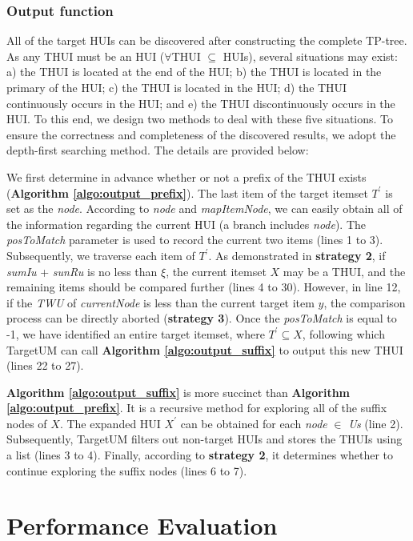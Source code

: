 \documentclass[journal]{IEEEtran}
\begin{document}
\subsubsection{Output function}

All of the target HUIs can be discovered after constructing the complete TP-tree. As any THUI must be an HUI ($\forall$THUI $\subseteq$ HUIs), several situations may exist: a) the THUI is located at the end of the HUI; b) the THUI is located in the primary of the HUI; c) the THUI is located in the HUI; d) the THUI continuously occurs in the HUI; and e) the THUI discontinuously occurs in the HUI. To this end, we design two methods to deal with these five situations. To ensure the correctness and completeness of the discovered results, we adopt the depth-first searching method. The details are provided below:


We first determine in advance whether or not a prefix of the THUI exists (\textbf{Algorithm \ref{algo:output_prefix}}). The last item of the target itemset $T^\prime$ is set as the \textit{node}. According to \textit{node} and \textit{mapItemNode}, we can easily obtain all of the information regarding the current HUI (a branch includes \textit{node}). The \textit{posToMatch} parameter is used to record the current two items (lines 1 to 3). Subsequently, we traverse each item of $T^\prime$. As demonstrated in \textbf{strategy 2}, if \textit{sumIu} + \textit{sunRu} is no less than $\xi$, the current itemset $X$ may be a THUI, and the remaining items should be compared further (lines 4 to 30). However, in line 12, if the \textit{TWU} of \textit{currentNode} is less than the current target item $y$, the comparison process can be directly aborted (\textbf{strategy 3}). Once the \textit{posToMatch} is equal to -1, we have identified an entire target itemset, where $T^\prime \subseteq X$, following which TargetUM can call \textbf{Algorithm \ref{algo:output_suffix}} to output this new THUI (lines 22 to 27).

\textbf{Algorithm \ref{algo:output_suffix}} is more succinct than \textbf{Algorithm \ref{algo:output_prefix}}. It is a recursive method for exploring all of the suffix nodes of $X$. The expanded HUI $ X ^ \prime $ can be obtained for each \textit{node} $\in$ \textit{Us} (line 2). Subsequently, TargetUM filters out non-target HUIs and stores the THUIs using a list (lines 3 to 4). Finally, according to \textbf{strategy 2}, it determines whether to continue exploring the suffix nodes (lines 6 to 7).


\section{Performance Evaluation}
\label{sec:experiments}
\end{document}

